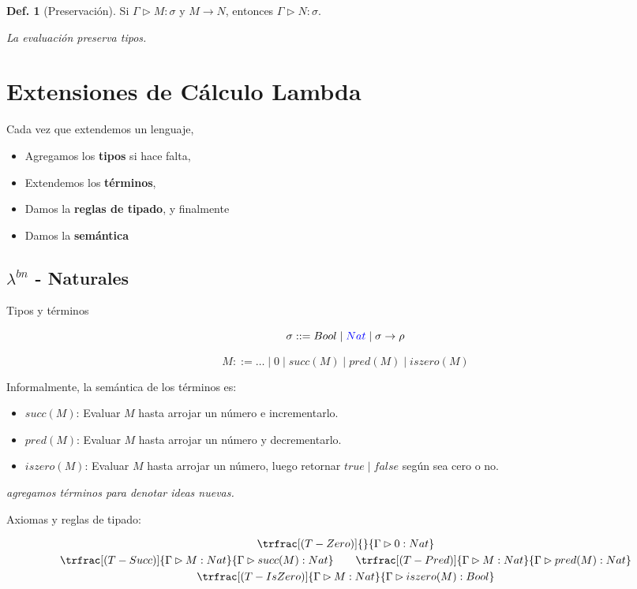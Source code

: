 \documentclass{report}
\theoremstyle{definition} %
\newtheorem{definition}{Def.}[chapter]
\newcommand{\tfunc}[2]{#1 \to #2}
\newcommand{\tipa}[3]{#1 \rhd #2 : #3} %
\newcommand{\Gtipa}[2]{\tipa{\Gamma}{#1}{#2}}
\newcommand{\lambdabn}{\lambda^{bn}}
\newcommand{\suc}[1]{succ(#1)}
\newcommand{\pred}[1]{pred(#1)}
\newcommand{\iszero}[1]{iszero(#1)}
\newcommand{\reduces}{\to}
\newcommand{\reduce}[2]{#1 \reduces #2}
\newcommand{\deriv}[3]{\trfrac[(#1)]{#2}{#3}}
\begin{document}
\begin{definition}[Preservación]
    Si $\Gtipa{M}{\sigma}$ y $\reduce{M}{N}$, entonces $\Gtipa{N}{\sigma}$.

    \textit{La evaluación preserva tipos.}
\end{definition}

\section{Extensiones de Cálculo Lambda}

Cada vez que extendemos un lenguaje,

\begin{itemize}
    \item Agregamos los \textbf{tipos} si hace falta,
    \item Extendemos los \textbf{términos},
    \item Damos la \textbf{reglas de tipado}, y finalmente
    \item Damos la \textbf{semántica}
\end{itemize}

\subsection{$\lambdabn$ - Naturales}

Tipos y términos

\[
\sigma ::= Bool \mid \textcolor{blue}{Nat} \mid \tfunc{\sigma}{\rho}
\]

\[
M ::= \dots \mid 0 \mid \suc{M} \mid \pred{M} \mid \iszero{M}
\]

Informalmente, la semántica de los términos es:

\begin{itemize}
    \item $\suc{M}$: Evaluar $M$ hasta arrojar un número e incrementarlo.
    \item $\pred{M}$: Evaluar $M$ hasta arrojar un número y decrementarlo.
    \item $\iszero{M}$: Evaluar $M$ hasta arrojar un número, luego retornar
    $true\mid false$ según sea cero o no.
\end{itemize}

\textit{agregamos términos para denotar ideas nuevas.}

Axiomas y reglas de tipado:

\begin{gather*}
    \deriv{T-Zero}
    {}
    {\Gtipa{0}{Nat}}\\
    \deriv{T-Succ}
        {\Gtipa{M}{Nat}}
        {\Gtipa{\suc{M}}{Nat}}
    \qquad
    \deriv{T-Pred}
        {\Gtipa{M}{Nat}}
        {\Gtipa{\pred{M}}{Nat}}\\
    \deriv{T-IsZero}
        {\Gtipa{M}{Nat}}
        {\Gtipa{\iszero{M}}{Bool}}
\end{gather*}
\end{document}
